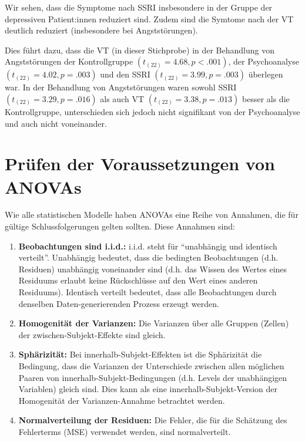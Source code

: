 \documentclass[
]{book}
\begin{document}
Wir sehen, dass die Symptome nach SSRI insbesondere in der Gruppe der depressiven Patient:innen reduziert sind. Zudem sind die Symtome nach der VT deutlich reduziert (insbesondere bei Angststörungen).

Dies führt dazu, dass die VT (in dieser Stichprobe) in der Behandlung von Angststörungen der Kontrollgruppe \((t_{(22)}=4.68, p<.001)\), der Psychoanalyse \((t_{(22)}=4.02, p=.003)\) und den SSRI \((t_{(22)}=3.99, p=.003)\) überlegen war. In der Behandlung von Angststörungen waren sowohl SSRI \((t_{(22)}=3.29, p=.016)\) als auch VT \((t_{(22)}=3.38, p=.013)\) besser als die Kontrollgruppe, unterschieden sich jedoch nicht signifikant von der Psychoanalyse und auch nicht voneinander.

\hypertarget{pruxfcfen-der-voraussetzungen-von-anovas}{%
\section{Prüfen der Voraussetzungen von ANOVAs}\label{pruxfcfen-der-voraussetzungen-von-anovas}}

Wie alle statistischen Modelle haben ANOVAs eine Reihe von Annahmen, die für gültige Schlussfolgerungen gelten sollten. Diese Annahmen sind:

\begin{enumerate}
\def\labelenumi{\arabic{enumi}.}
\item
  \textbf{Beobachtungen sind i.i.d.:} i.i.d. steht für ``unabhängig und identisch verteilt''. Unabhängig bedeutet, dass die bedingten Beobachtungen (d.h. Residuen) unabhängig voneinander sind (d.h. das Wissen des Wertes eines Residuums erlaubt keine Rückschlüsse auf den Wert eines anderen Residuums). Identisch verteilt bedeutet, dass alle Beobachtungen durch denselben Daten-generierenden Prozess erzeugt werden.
\item
  \textbf{Homogenität der Varianzen:} Die Varianzen über alle Gruppen (Zellen) der zwischen-Subjekt-Effekte sind gleich.
\item
  \textbf{Sphärizität:} Bei innerhalb-Subjekt-Effekten ist die Sphärizität die Bedingung, dass die Varianzen der Unterschiede zwischen allen möglichen Paaren von innerhalb-Subjekt-Bedingungen (d.h. Levels der unabhängigen Variablen) gleich sind. Dies kann als eine innerhalb-Subjekt-Version der Homogenität der Varianzen-Annahme betrachtet werden.
\item
  \textbf{Normalverteilung der Residuen:} Die Fehler, die für die Schätzung des Fehlerterms (MSE) verwendet werden, sind normalverteilt.
\end{enumerate}
\end{document}
